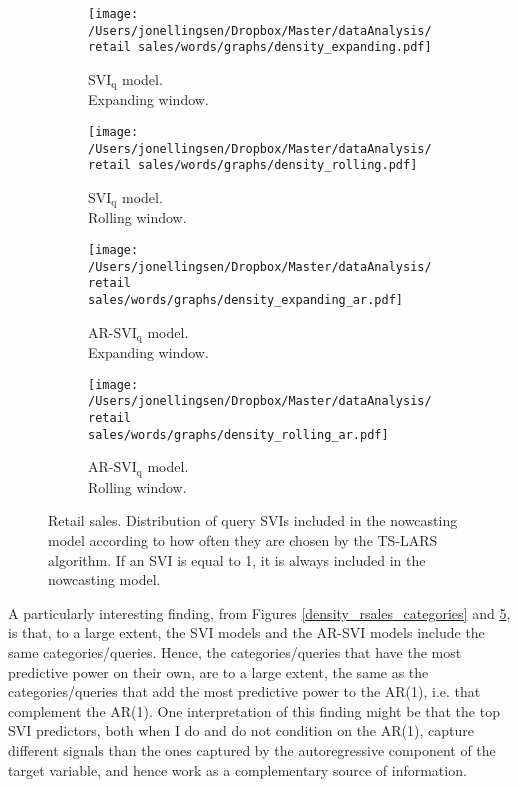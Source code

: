 \begin{figure}[H]
    \centering
    \begin{subfigure}[b]{0.45\textwidth}
\caption{$\text{SVI}_\text{q}$ model.\\Expanding window.}
\label{density_plain_expanding_queries}
        \texttt{[image: /Users/jonellingsen/Dropbox/Master/dataAnalysis/retail sales/words/graphs/density\_expanding.pdf]}
    \end{subfigure}
    \begin{subfigure}[b]{0.45\textwidth}
\caption{$\text{SVI}_\text{q}$ model.\\Rolling window.}
\label{density_plain_rolling_queries}
        \texttt{[image: /Users/jonellingsen/Dropbox/Master/dataAnalysis/retail sales/words/graphs/density\_rolling.pdf]}
    \end{subfigure}
\begin{subfigure}[b]{0.45\textwidth}
\caption{AR-$\text{SVI}_\text{q}$ model.\\Expanding window.}
\label{density_ar_expanding_queries}       
\texttt{[image: /Users/jonellingsen/Dropbox/Master/dataAnalysis/retail sales/words/graphs/density\_expanding\_ar.pdf]}
    \end{subfigure}
\begin{subfigure}[b]{0.45\textwidth}
\caption{AR-$\text{SVI}_\text{q}$ model.\\Rolling window.}
\label{density_ar_rolling_queries}       
\texttt{[image: /Users/jonellingsen/Dropbox/Master/dataAnalysis/retail sales/words/graphs/density\_rolling\_ar.pdf]}
    \end{subfigure}
\caption{Retail sales. Distribution of query SVIs included in the nowcasting model according to how often they are chosen by the TS-LARS algorithm. If an SVI is equal to 1, it is always included in the nowcasting model.}
\label{density_rsales_queries}
\end{figure}

A particularly interesting finding, from Figures \ref{density_rsales_categories} and \ref{density_rsales_queries}, is that, to a large extent, the SVI models and the AR-SVI models include the same categories/queries. Hence, the categories/queries that have the most predictive power on their own, are to a large extent, the same as the categories/queries that add the most predictive power to the AR(1), i.e. that complement the AR(1). One interpretation of this finding might be that the top SVI predictors, both when I do and do not condition on the AR(1), capture different signals than the ones captured by the autoregressive component of the target variable, and hence work as a complementary source of information.
